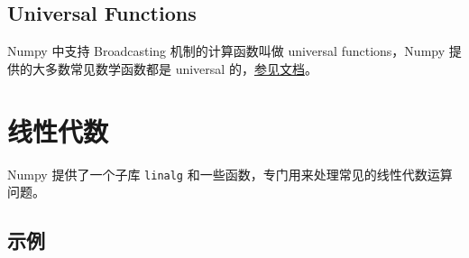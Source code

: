 \documentclass[11pt]{article}
\begin{document}
\hypertarget{universal-functions}{%
\subsection{Universal Functions}\label{universal-functions}}

Numpy 中支持 Broadcasting 机制的计算函数叫做 universal functions，Numpy
提供的大多数常见数学函数都是 universal
的，\href{https://docs.scipy.org/doc/numpy/reference/ufuncs.html\#available-ufuncs}{参见文档}。

    \hypertarget{ux7ebfux6027ux4ee3ux6570}{%
\section{线性代数}\label{ux7ebfux6027ux4ee3ux6570}}

Numpy 提供了一个子库 \texttt{linalg}
和一些函数，专门用来处理常见的线性代数运算问题。

\hypertarget{ux793aux4f8b}{%
\subsection{示例}\label{ux793aux4f8b}}
\end{document}
